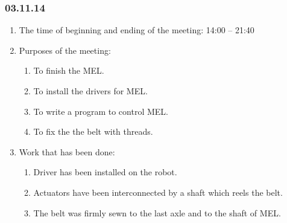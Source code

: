	
\subsubsection{03.11.14}

\begin{enumerate}
	\item The time of beginning and ending of the meeting:
	14:00 – 21:40
	\item Purposes of the meeting:
	\begin{enumerate}
	  \item	To finish the MEL.
	  
	  \item To install the drivers for MEL.
	  
	  \item To	write a program to control MEL.
	  
	  \item To fix the the belt with threads.
	  
    \end{enumerate}
    
	\item Work that has been done:
	\begin{enumerate}
	  \item	Driver has been installed on the robot.
      
      \item	Actuators have been interconnected by a shaft which reels the belt.
      
      \item	The belt was firmly sewn to the last axle and to the shaft of MEL.
      

\end{enumerate}
\end{enumerate}
